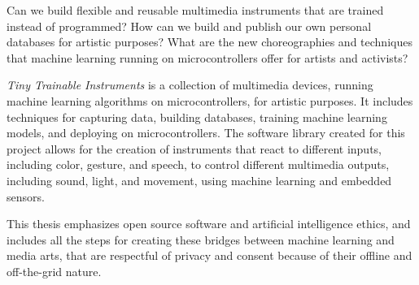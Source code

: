 % 
%
%
Can we build flexible and reusable multimedia instruments that are trained instead of programmed? How can we build and publish our own personal databases for artistic purposes? What are the new choreographies and techniques that machine learning running on microcontrollers offer for artists and activists?

 \emph{Tiny Trainable Instruments} is a collection of multimedia devices, running machine learning algorithms on microcontrollers, for artistic purposes. It includes techniques for capturing data, building databases, training machine learning models, and deploying on microcontrollers. The software library created for this project allows for the creation of instruments that react to different inputs, including color, gesture, and speech, to control different multimedia outputs, including sound, light, and movement, using machine learning and embedded sensors.

This thesis emphasizes open source software and artificial intelligence ethics, and includes all the steps for creating these bridges between machine learning and media arts, that are respectful of privacy and consent because of their offline and off-the-grid nature.
